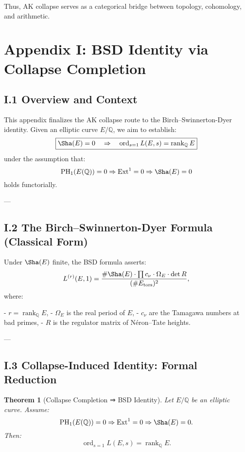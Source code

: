 \documentclass[11pt]{article}
\newtheorem{theorem}{Theorem}[section]
\theoremstyle{definition}
\begin{document}
Thus, AK collapse serves as a categorical bridge between topology, cohomology, and arithmetic.





\section*{Appendix I: BSD Identity via Collapse Completion}

\subsection*{I.1 Overview and Context}

This appendix finalizes the AK collapse route to the Birch–Swinnerton-Dyer identity.  
Given an elliptic curve \( E/\mathbb{Q} \), we aim to establish:
\[
\boxed{\Sha(E) = 0 \quad \Rightarrow \quad \operatorname{ord}_{s=1} L(E,s) = \operatorname{rank}_{\mathbb{Q}} E}
\]
under the assumption that:
\[
\mathrm{PH}_1(E(\mathbb{Q})) = 0 \Rightarrow \mathrm{Ext}^1 = 0 \Rightarrow \Sha(E) = 0
\]
holds functorially.

---

\subsection*{I.2 The Birch–Swinnerton-Dyer Formula (Classical Form)}

Under \( \Sha(E) \) finite, the BSD formula asserts:
\[
L^{(r)}(E, 1) = \frac{\#\Sha(E) \cdot \prod c_\nu \cdot \Omega_E \cdot \det R}{(\# E_{\text{tors}})^2},
\]
where:

- \( r = \operatorname{rank}_{\mathbb{Q}} E \),
- \( \Omega_E \) is the real period of \( E \),
- \( c_\nu \) are the Tamagawa numbers at bad primes,
- \( R \) is the regulator matrix of Néron–Tate heights.

---

\subsection*{I.3 Collapse-Induced Identity: Formal Reduction}

\begin{theorem}[Collapse Completion ⇒ BSD Identity]
Let \( E/\mathbb{Q} \) be an elliptic curve.  
Assume:
\[
\mathrm{PH}_1(E(\mathbb{Q})) = 0 \Rightarrow \mathrm{Ext}^1 = 0 \Rightarrow \Sha(E) = 0.
\]
Then:
\[
\operatorname{ord}_{s=1} L(E,s) = \operatorname{rank}_{\mathbb{Q}} E.
\]
\end{theorem}
\end{document}
